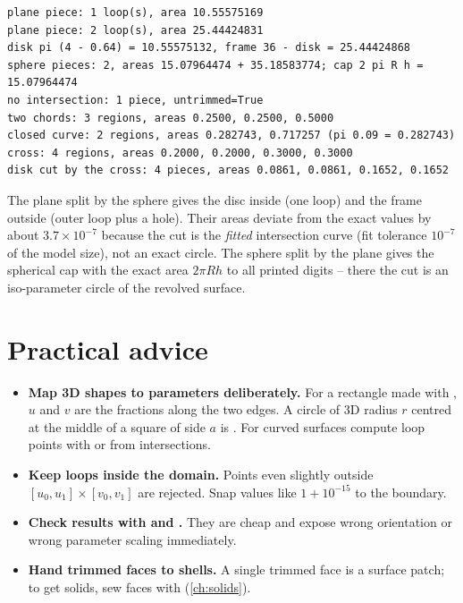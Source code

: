 
\begin{lstlisting}[style=text]
plane piece: 1 loop(s), area 10.55575169
plane piece: 2 loop(s), area 25.44424831
disk pi (4 - 0.64) = 10.55575132, frame 36 - disk = 25.44424868
sphere pieces: 2, areas 15.07964474 + 35.18583774; cap 2 pi R h = 15.07964474
no intersection: 1 piece, untrimmed=True
two chords: 3 regions, areas 0.2500, 0.2500, 0.5000
closed curve: 2 regions, areas 0.282743, 0.717257 (pi 0.09 = 0.282743)
cross: 4 regions, areas 0.2000, 0.2000, 0.3000, 0.3000
disk cut by the cross: 4 pieces, areas 0.0861, 0.0861, 0.1652, 0.1652
\end{lstlisting}

The plane split by the sphere gives the disc inside (one loop) and the frame outside (outer
loop plus a hole). Their areas deviate from the exact values by about $3.7\times10^{-7}$
because the cut is the \emph{fitted} intersection curve (fit tolerance $10^{-7}$ of the model
size), not an exact circle. The sphere split by the plane gives the spherical cap with the
exact area $2\pi R h$ to all printed digits -- there the cut is an iso-parameter circle of the
revolved surface.

\section{Practical advice}\label{sec:trim-advice}

\begin{itemize}
\item \textbf{Map 3D shapes to parameters deliberately.} For a rectangle made with
, $u$ and $v$ are the fractions along the two
edges. A circle of 3D radius $r$ centred at the middle of a square of side $a$ is
. For curved surfaces compute loop points with
 or from intersections.
\item \textbf{Keep loops inside the domain.} Points even slightly outside $[u_0,u_1]\times
[v_0,v_1]$ are rejected. Snap values like $1+10^{-15}$ to the boundary.
\item \textbf{Check results with  and .} They are cheap and
expose wrong orientation or wrong parameter scaling immediately.
\item \textbf{Hand trimmed faces to shells.} A single trimmed face is a surface patch; to get
solids, sew faces with  (\cref{ch:solids}).
\end{itemize}
